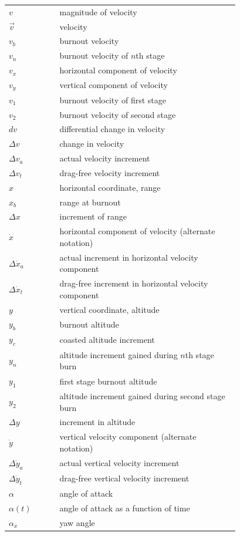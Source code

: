 \begin{longtable}{@{}l p{0.78\linewidth}@{}}
$v$ & magnitude of velocity \\
$\vec{v}$ & velocity \\
$v_b$ & burnout velocity \\
$v_n$ & burnout velocity of $n$th stage \\
$v_x$ & horizontal component of velocity \\
$v_y$ & vertical component of velocity \\
$v_1$ & burnout velocity of first stage \\
$v_2$ & burnout velocity of second stage \\
$dv$ & differential change in velocity \\
$\Delta v$ & change in velocity \\
$\Delta v_a$ & actual velocity increment \\
$\Delta v_t$ & drag-free velocity increment \\
$x$ & horizontal coordinate, range \\
$x_b$ & range at burnout \\
$\Delta x$ & increment of range \\
$\dot{x}$ & horizontal component of velocity (alternate notation) \\
$\Delta\dot{x}_a$ & actual increment in horizontal velocity component \\
$\Delta\dot{x}_t$ & drag-free increment in horizontal velocity component \\
$y$ & vertical coordinate, altitude \\
$y_b$ & burnout altitude \\
$y_c$ & coasted altitude increment \\
$y_n$ & altitude increment gained during $n$th stage burn \\
$y_1$ & first stage burnout altitude \\
$y_2$ & altitude increment gained during second stage burn \\
$\Delta y$ & increment in altitude \\
$\dot{y}$ & vertical velocity component (alternate notation) \\
$\Delta\dot{y}_a$ & actual vertical velocity increment \\
$\Delta\dot{y}_t$ & drag-free vertical velocity increment \\
$\alpha$ & angle of attack \\
$\alpha(t)$ & angle of attack as a function of time \\
$\alpha_x$ & yaw angle \\

\end{longtable}
